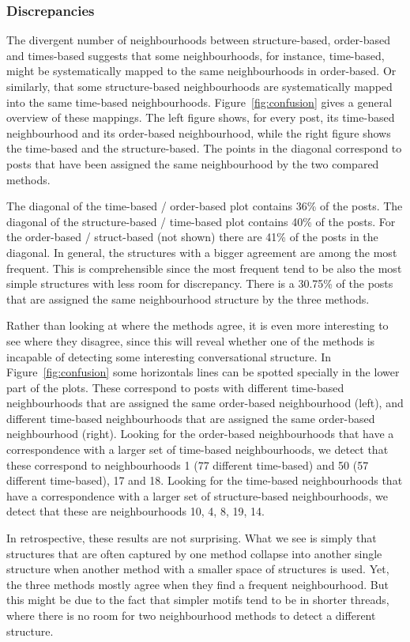 \documentclass[conference]{IEEEtran}
\begin{document}
\subsubsection{Discrepancies}
The divergent number of neighbourhoods between structure-based, order-based and times-based suggests that some neighbourhoods, for instance, time-based, might be systematically mapped to the same neighbourhoods in order-based. Or similarly, that some structure-based neighbourhoods are systematically mapped into the same time-based neighbourhoods. Figure~\ref{fig:confusion} gives a general overview of these mappings. The left figure shows, for every post, its time-based neighbourhood and its order-based neighbourhood, while the right figure shows the time-based and the structure-based. The points in the diagonal correspond to posts that have been assigned the same neighbourhood by the two compared methods. 

The diagonal of the time-based / order-based plot contains 36\% of the posts. The diagonal of the structure-based / time-based plot contains 40\% of the posts. For the order-based / struct-based (not shown) there are 41\% of the posts in the diagonal. In general, the structures with a bigger agreement are among the most frequent. This is comprehensible since the most frequent tend to be also the most simple structures with less room for discrepancy. There is a 30.75\% of the posts that are assigned the same neighbourhood structure by the three methods. 

Rather than looking at where the methods agree, it is even more interesting to see where they disagree, since this will reveal whether one of the methods is incapable of detecting some interesting conversational structure. In Figure~\ref{fig:confusion} some horizontals lines can be spotted specially in the lower part of the plots. These correspond to posts with different time-based neighbourhoods that are assigned the same order-based neighbourhood (left), and different time-based neighbourhoods that are assigned the same order-based neighbourhood (right). Looking for the order-based neighbourhoods that have a correspondence with a larger set of time-based neighbourhoods, we detect that these correspond to neighbourhoods 1 (77 different time-based) and 50 (57 different time-based), 17 and 18. Looking for the time-based neighbourhoods that have a correspondence with a larger set of structure-based neighbourhoods, we detect that these are neighbourhoods 10, 4, 8, 19, 14.

In retrospective, these results are not surprising. What we see is simply that structures that are often captured by one method collapse into another single structure when another method with a smaller space of structures is used. Yet, the three methods mostly agree when they find a frequent neighbourhood. But this might be due to the fact that simpler motifs tend to be in shorter threads, where there is no room for two neighbourhood methods to detect a different structure.
\end{document}
